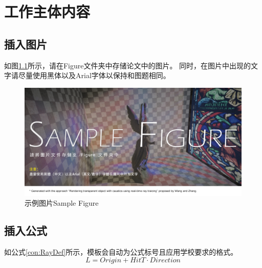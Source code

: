 \chapter{工作主体内容}
\section{插入图片}
如图\ref{fig:samplefigure}所示，请在Figure文件夹中存储论文中的图片。
同时，在图片中出现的文字请尽量使用黑体以及Arial字体以保持和图题相同。
\begin{figure}[htb]
	\centering
	\includegraphics[width=1.0\linewidth]{Figure/SampleFigure}
	\caption{示例图片Sample Figure}
	\label{fig:samplefigure}
\end{figure}

\section{插入公式}
如公式\ref{con:RayDef}所示，模板会自动为公式标号且应用学校要求的格式。
\begin{equation}
	L = Origin + HitT \cdot Direction
	\label{con:RayDef}
\end{equation}